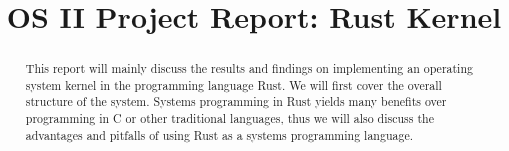 \documentclass[conference]{IEEEtran}
\begin{document}
%
\title{OS II Project Report: Rust Kernel}


\author{
}


% 








\maketitle

\begin{abstract}
This report will mainly discuss the results and findings on implementing an operating system kernel in the programming language Rust. We will first cover the overall structure of the system. Systems programming in Rust yields many benefits over programming in C or other traditional languages, thus we will also discuss the advantages and pitfalls of using Rust as a systems programming language.
\end{abstract}
\end{document}
